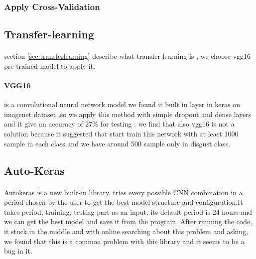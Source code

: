 \subsubsection{Apply Cross-Validation}
\subsection{Transfer-learning}
\paragraph{}
section \ref{sec:transferlearning} describe what transfer learning is , we choose vgg16 pre trained model to apply it.
\paragraph{VGG16}
is a convolutional neural network model we found it built in layer in keras on imagenet dataset ,so we apply this method with simple dropout and dense layers and it give an accuracy of 27\% for testing .
we find that also vgg16 is not a solution because it suggested that start train this network with at least 1000 sample in each class and we have around 500 sample only in disgust class.
\subsection{Auto-Keras}
\paragraph{}
Autokeras is a new built-in library, tries every possible CNN combination in a period chosen by the user to get the best model structure and configuration.It takes period, training, testing part as an input, its default period is 24 hours and we can get the best model and save it from the program.
After running the code, it stuck in the middle and with online searching about this problem and asking, we found that this is a common problem with this library and it seems to be a bug in it.
